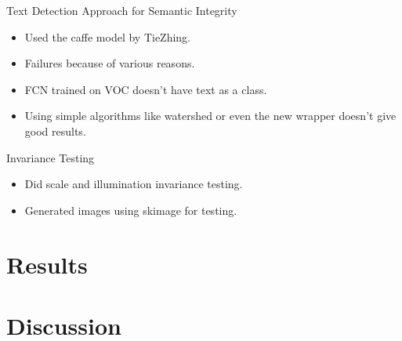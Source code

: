 \documentclass{article}
\begin{document}
Text Detection Approach for Semantic Integrity
\begin{itemize}
\item Used the caffe model by TieZhing.
\item Failures because of various reasons.
\item FCN trained on VOC doesn't have text as a class.
\item Using simple algorithms like watershed or even the new wrapper doesn't give good results.
\end{itemize}

Invariance Testing
\begin{itemize}
\item Did scale and illumination invariance testing.
\item Generated images using skimage for testing.
\end{itemize}

\section{Results}
\section{Discussion}
\end{document}
